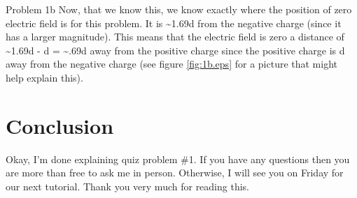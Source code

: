 \begin{homeworkProblem}
\begin{homeworkSection}{Problem 1b}
Now, that we know this, we know exactly where the position of zero electric field is for this problem. It is \textasciitilde1.69d from the negative charge (since it has a larger magnitude). This means that the electric field is zero a distance of  \textasciitilde 1.69d - d = \textasciitilde.69d away from the positive charge since the positive charge is d away from the negative charge (see figure \ref{fig:1b.eps} for a picture that might help explain this).
\end{homeworkSection}

\section{Conclusion}
Okay, I'm done explaining quiz problem \#1. If you have any questions then you are more than free to ask me in person. Otherwise, I will see you on Friday for our next tutorial. Thank you very much for reading this.
\end{homeworkProblem}